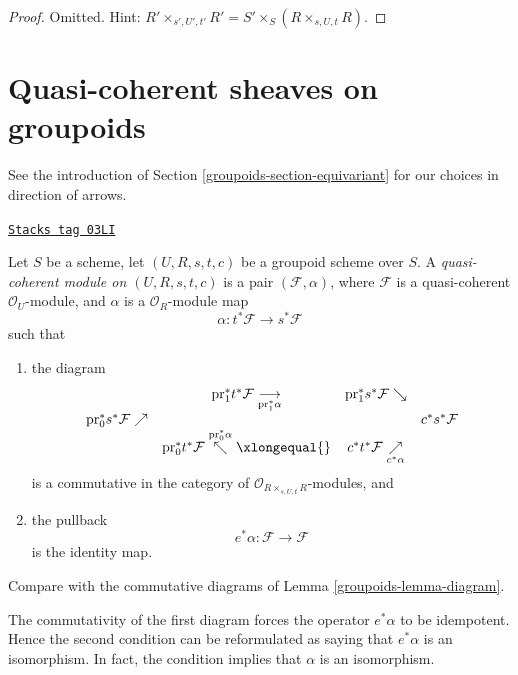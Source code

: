 \begin{proof}
Omitted. Hint:
$R' \times_{s', U', t'} R' = S' \times_S (R \times_{s, U, t} R)$.
\end{proof}

\section{Quasi-coherent sheaves on groupoids}
\label{groupoids-section-groupoids-quasi-coherent}
See the introduction of Section \ref{groupoids-section-equivariant} for our
choices in direction of arrows.

\begin{definition}
\label{groupoids-definition-groupoid-module}
\href{https://stacks.math.columbia.edu/tag/03LI}{\texttt{Stacks tag 03LI}}

Let $S$ be a scheme, let $(U, R, s, t, c)$ be a groupoid scheme over $S$.
A {\it quasi-coherent module on $(U, R, s, t, c)$}
is a pair $(\mathcal{F}, \alpha)$, where $\mathcal{F}$ is a quasi-coherent
$\mathcal{O}_U$-module, and $\alpha$ is a $\mathcal{O}_R$-module
map
$$
\alpha : t^*\mathcal{F} \longrightarrow s^*\mathcal{F}
$$
such that
\begin{enumerate}
\item the diagram
$$
\begin{array}{cccc} & \text{pr}_1^*t^*\mathcal{F} \underset{\text{pr}_1^*\alpha}{\longrightarrow} & \text{pr}_1^*s^*\mathcal{F} \searrow &  \\ \text{pr}_0^*s^*\mathcal{F} \nearrow &  &  & c^*s^*\mathcal{F} \\  & \text{pr}_0^*t^*\mathcal{F} \overset{\text{pr}_0^*\alpha}{\nwarrow}\xlongequal{} & c^*t^*\mathcal{F} \underset{c^*\alpha}{\nearrow} & \end{array}
$$
is a commutative in the category of
$\mathcal{O}_{R \times_{s, U, t} R}$-modules, and
\item the pullback
$$
e^*\alpha : \mathcal{F} \longrightarrow \mathcal{F}
$$
is the identity map.
\end{enumerate}
Compare with the commutative diagrams of Lemma \ref{groupoids-lemma-diagram}.
\end{definition}

The commutativity of the first diagram forces the operator $e^*\alpha$
to be idempotent. Hence the second condition can be reformulated as saying
that $e^*\alpha$ is an isomorphism. In fact, the condition implies that
$\alpha$ is an isomorphism.

